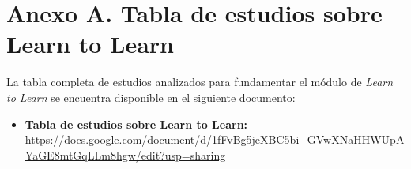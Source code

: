\section*{Anexo A. Tabla de estudios sobre Learn to Learn}
\label{anexo:learn_to_learn}

La tabla completa de estudios analizados para fundamentar el módulo de \textit{Learn to Learn} se encuentra disponible en el siguiente documento:

\begin{itemize}
    \item \textbf{Tabla de estudios sobre Learn to Learn:} \url{https://docs.google.com/document/d/1fFvBg5jeXBC5bi_GVwXNaHHWUpAYaGE8mtGqLLm8hgw/edit?usp=sharing}
\end{itemize}